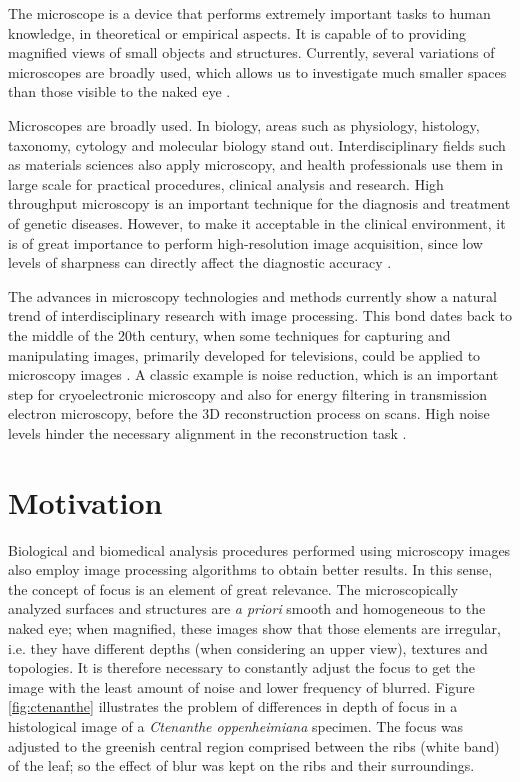 The microscope is a device that performs extremely important tasks to human knowledge, in theoretical or empirical aspects. It is capable of to providing magnified views of small objects and structures. Currently, several variations of microscopes are broadly used, which allows us to investigate much smaller spaces than those visible to the naked eye \cite{wu2008microscope}.

Microscopes are broadly used. In biology, areas such as physiology, histology, taxonomy, cytology and molecular biology stand out. Interdisciplinary fields such as materials sciences also apply microscopy, and health professionals use them in large scale for practical procedures, clinical analysis and research. High throughput microscopy is an important technique for the diagnosis and treatment of genetic diseases. However, to make it acceptable in the clinical environment, it is of great importance to perform high-resolution image acquisition, since low levels of sharpness can directly affect the diagnostic accuracy \cite{qiu2013evaluations}.

The advances in microscopy technologies and methods currently show a natural trend of interdisciplinary research with image processing. This bond dates back to the middle of the 20th century, when some techniques for capturing and manipulating images, primarily developed for televisions, could be
applied to microscopy images \cite{wu2008microscope}. A classic example is noise reduction, which is an important step for cryoelectronic microscopy and also for energy filtering in transmission electron microscopy, before the 3D reconstruction process on  scans. High noise levels hinder the necessary alignment in the reconstruction task \cite{vyas2017multiscale}.

\section{Motivation}

Biological and biomedical analysis procedures performed using microscopy images also employ image processing algorithms to obtain better results. In this sense, the concept of focus is an element of great relevance. The microscopically analyzed surfaces and structures are \emph{a priori} smooth and homogeneous to the naked eye; when magnified, these images show that those elements are irregular, i.e. they have different depths (when considering an upper view), textures and topologies. It is therefore necessary to constantly adjust the focus to get the image with the least amount of noise and lower frequency of blurred. Figure \ref{fig:ctenanthe} illustrates the problem of differences in depth of focus in a histological image of a \emph{Ctenanthe oppenheimiana} specimen. The focus was adjusted to the greenish central region comprised between the ribs (white band) of the leaf; so the effect of blur was kept on the ribs and their surroundings.

